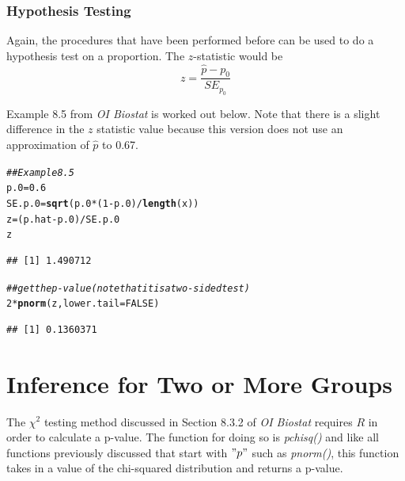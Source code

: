 \documentclass{report}\usepackage[]{graphicx}\usepackage[]{color}
\makeatletter
\newcommand{\hlnum}[1]{\textcolor[rgb]{0.686,0.059,0.569}{#1}}%
\newcommand{\hlcom}[1]{\textcolor[rgb]{0.678,0.584,0.686}{\textit{#1}}}%
\newcommand{\hlopt}[1]{\textcolor[rgb]{0,0,0}{#1}}%
\newcommand{\hlstd}[1]{\textcolor[rgb]{0.345,0.345,0.345}{#1}}%
\newcommand{\hlkwb}[1]{\textcolor[rgb]{0.69,0.353,0.396}{#1}}%
\newcommand{\hlkwc}[1]{\textcolor[rgb]{0.333,0.667,0.333}{#1}}%
\newcommand{\hlkwd}[1]{\textcolor[rgb]{0.737,0.353,0.396}{\textbf{#1}}}%
\newenvironment{kframe}{%
 \def\at@end@of@kframe{}%
 \ifinner\ifhmode%
  \def\at@end@of@kframe{\end{minipage}}%
  \begin{minipage}{\columnwidth}%
 \fi\fi%
 \def\FrameCommand##1{\hskip\@totalleftmargin \hskip-\fboxsep
 \colorbox{shadecolor}{##1}\hskip-\fboxsep
     \hskip-\linewidth \hskip-\@totalleftmargin \hskip\columnwidth}%
 \MakeFramed {\advance\hsize-\width
   \@totalleftmargin\z@ \linewidth\hsize
   \@setminipage}}%
 {\par\unskip\endMakeFramed%
 \at@end@of@kframe}
\newenvironment{knitrout}{}{} %
\makeatother
\begin{document}
\subsubsection{Hypothesis Testing}
Again, the procedures that have been performed before can be used to do a hypothesis test on a proportion.  The $z$-statistic would be 
\[ z = \frac{\hat{p}-p_0}{SE_{p_0}}\]

Example 8.5 from \textit{OI Biostat} is worked out below.  Note that there is a slight difference in the $z$ statistic value because this version does not use an approximation of $\hat{p}$ to 0.67.  
\begin{knitrout}
\color{fgcolor}\begin{kframe}
\begin{alltt}
\hlcom{## Example 8.5}
\hlstd{p.0} \hlkwb{=} \hlnum{0.6}
\hlstd{SE.p.0} \hlkwb{=} \hlkwd{sqrt}\hlstd{(p.0}\hlopt{*}\hlstd{(}\hlnum{1}\hlopt{-}\hlstd{p.0)}\hlopt{/}\hlkwd{length}\hlstd{(x))}
\hlstd{z} \hlkwb{=} \hlstd{(p.hat} \hlopt{-} \hlstd{p.0)}\hlopt{/}\hlstd{SE.p.0}
\hlstd{z}
\end{alltt}
\begin{verbatim}
## [1] 1.490712
\end{verbatim}
\begin{alltt}
\hlcom{## get the p-value (note that it is a two-sided test)}
\hlnum{2}\hlopt{*}\hlkwd{pnorm}\hlstd{(z,} \hlkwc{lower.tail} \hlstd{=} \hlnum{FALSE}\hlstd{)}
\end{alltt}
\begin{verbatim}
## [1] 0.1360371
\end{verbatim}
\end{kframe}
\end{knitrout}


\section{Inference for Two or More Groups}
The $\chi^2$ testing method discussed in Section 8.3.2 of \textit{OI Biostat} requires $R$ in order to calculate a p-value.  The function for doing so is \textit{pchisq()} and like all functions previously discussed that start with $"p"$ such as \textit{pnorm()}, this function takes in a value of the chi-squared distribution and returns a p-value.  
\end{document}
